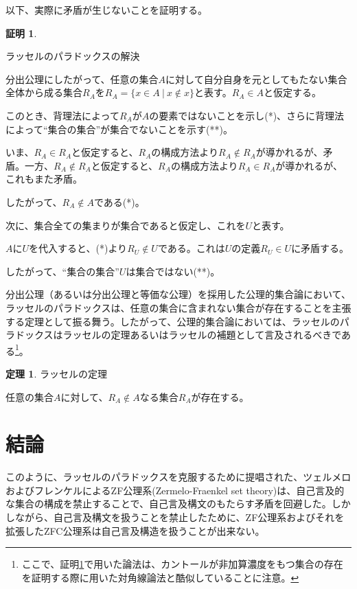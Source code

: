 \documentclass[10pt, a5paper, twoside]{jsarticle}
\theoremstyle{definition}
\newtheorem{thm}{定理}
\newtheorem{prf}{証明}
\begin{document}
			以下、実際に矛盾が生じないことを証明する。

			\begin{prf}\label{sol}
				
				ラッセルのパラドックスの解決

				分出公理にしたがって、任意の集合$A$に対して自分自身を元としてもたない集合全体から成る集合$R_A$を$ R_A = \{ x \in A \ |\  x \notin x \} $と表す。$R_A \in A$と仮定する。

				このとき、背理法によって$R_A$が$A$の要素ではないことを示し(*)、さらに背理法によって“集合の集合”が集合でないことを示す(**)。

				いま、$R_A \in R_A$と仮定すると、$R_A$の構成方法より$R_A \notin R_A$が導かれるが、矛盾。一方、$R_A \notin R_A$と仮定すると、$R_A$の構成方法より$R_A \in R_A$が導かれるが、これもまた矛盾。

				したがって、$R_A \notin A$である(*)。

				次に、集合全ての集まりが集合であると仮定し、これを$U$と表す。

				$A$に$U$を代入すると、(*)より$R_U \notin U$である。これは$U$の定義$R_U \in U$に矛盾する。

				したがって、“集合の集合”$U$は集合ではない(**)。

			\end{prf}

			分出公理（あるいは分出公理と等価な公理）を採用した公理的集合論において、ラッセルのパラドックスは、任意の集合に含まれない集合が存在することを主張する定理として振る舞う。したがって、公理的集合論においては、ラッセルのパラドックスはラッセルの定理あるいはラッセルの補題として言及されるべきである\footnote{ここで、証明\ref{sol}で用いた論法は、カントールが非加算濃度をもつ集合の存在を証明する際に用いた対角線論法と酷似していることに注意。}。

			\begin{thm}
				
				ラッセルの定理

				任意の集合$A$に対して、$R_A \notin A$なる集合$R_A$が存在する。

			\end{thm}

	\section{結論}

		このように、ラッセルのパラドックスを克服するために提唱された、ツェルメロおよびフレンケルによるZF公理系(Zermelo-Fraenkel set theory)は、自己言及的な集合の構成を禁止することで、自己言及構文のもたらす矛盾を回避した。しかしながら、自己言及構文を扱うことを禁止したために、ZF公理系およびそれを拡張したZFC公理系は自己言及構造を扱うことが出来ない\cite{ytb}。
\end{document}
